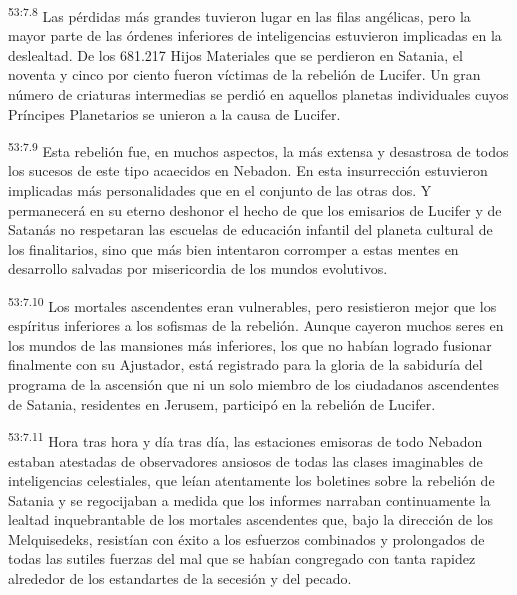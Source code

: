 \par
\textsuperscript{53:7.8} Las pérdidas más grandes tuvieron lugar en las filas angélicas, pero la mayor parte de las órdenes inferiores de inteligencias estuvieron implicadas en la deslealtad. De los 681.217 Hijos Materiales que se perdieron en Satania, el noventa y cinco por ciento fueron víctimas de la rebelión de Lucifer. Un gran número de criaturas intermedias se perdió en aquellos planetas individuales cuyos Príncipes Planetarios se unieron a la causa de Lucifer.

\par
\textsuperscript{53:7.9} Esta rebelión fue, en muchos aspectos, la más extensa y desastrosa de todos los sucesos de este tipo acaecidos en Nebadon. En esta insurrección estuvieron implicadas más personalidades que en el conjunto de las otras dos. Y permanecerá en su eterno deshonor el hecho de que los emisarios de Lucifer y de Satanás no respetaran las escuelas de educación infantil del planeta cultural de los finalitarios, sino que más bien intentaron corromper a estas mentes en desarrollo salvadas por misericordia de los mundos evolutivos.

\par
\textsuperscript{53:7.10} Los mortales ascendentes eran vulnerables, pero resistieron mejor que los espíritus inferiores a los sofismas de la rebelión. Aunque cayeron muchos seres en los mundos de las mansiones más inferiores, los que no habían logrado fusionar finalmente con su Ajustador, está registrado para la gloria de la sabiduría del programa de la ascensión que ni un solo miembro de los ciudadanos ascendentes de Satania, residentes en Jerusem, participó en la rebelión de Lucifer.

\par
\textsuperscript{53:7.11} Hora tras hora y día tras día, las estaciones emisoras de todo Nebadon estaban atestadas de observadores ansiosos de todas las clases imaginables de inteligencias celestiales, que leían atentamente los boletines sobre la rebelión de Satania y se regocijaban a medida que los informes narraban continuamente la lealtad inquebrantable de los mortales ascendentes que, bajo la dirección de los Melquisedeks, resistían con éxito a los esfuerzos combinados y prolongados de todas las sutiles fuerzas del mal que se habían congregado con tanta rapidez alrededor de los estandartes de la secesión y del pecado.

